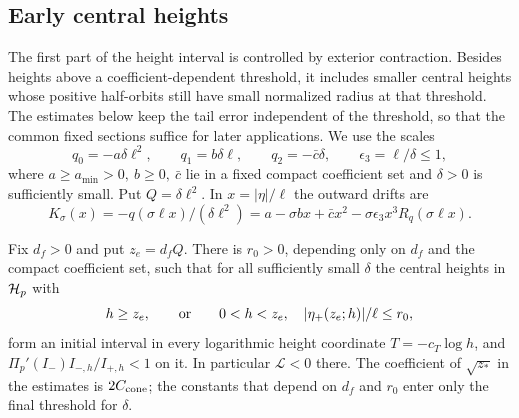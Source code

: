 \subsection{Early central heights}
\label{sec:early-central-heights}

The first part of the height interval is controlled by exterior
contraction. Besides heights above a coefficient-dependent threshold,
it includes smaller central heights whose positive half-orbits still
have small normalized radius at that threshold. The estimates below
keep the tail error independent of the threshold, so that the common
fixed sections suffice for later applications. We use the scales
\begin{equation}
\label{eq:direct-quadratic-prefix-scales}
 q_0=-a\delta\ell^2,\qquad q_1=b\delta\ell,\qquad
 q_2=-\bar c\delta,\qquad \epsilon_3=\ell/\delta\le1,
\end{equation}
where \(a\ge a_{\min}>0,\ b\ge0,\ \bar c\) lie in a fixed compact
coefficient set and \(\delta>0\) is sufficiently small. Put
\(Q=\delta\ell^2\). In \(x=|\eta|/\ell\) the outward drifts are
\[
 K_\sigma(x)=-q(\sigma\ell x)/(\delta\ell^2)
 =a-\sigma bx+\bar c x^2-\sigma\epsilon_3 x^3R_q(\sigma\ell x).
\]

\begin{lemma}
\label{lem:early-central-heights}
Fix \(d_f>0\) and put \(z_e=d_fQ\). There is \(r_0>0\), depending only
on \(d_f\) and the compact coefficient set, such that for all
sufficiently small \(\delta\) the central heights in \(\mathcal H_p\) with
\begin{equation}
\label{eq:direct-primary-early}
 h\ge z_e,\qquad\hbox{or}\qquad
 0<h<z_e,\quad |\eta_+(z_e;h)|/\ell\le r_0,
\end{equation}
form an initial interval in every logarithmic height coordinate
\(T=-c_T\log h\), and
\(\Pi_p'(I_-)I_{-,h}/I_{+,h}<1\) on it. In particular
\(\mathcal L<0\) there. The coefficient of \(\sqrt{z_*}\) in the
estimates is \(2C_{\rm cone}\); the constants that depend on
\(d_f\) and \(r_0\) enter only the final threshold for \(\delta\).
\end{lemma}

